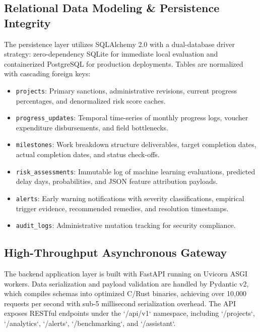\documentclass[conference]{IEEEtran}
\begin{document}
\subsection{Relational Data Modeling \& Persistence Integrity}
The persistence layer utilizes SQLAlchemy 2.0 with a dual-database driver strategy: zero-dependency SQLite for immediate local evaluation and containerized PostgreSQL for production deployments. Tables are normalized with cascading foreign keys:
\begin{itemize}
    \item \texttt{projects}: Primary sanctions, administrative revisions, current progress percentages, and denormalized risk score caches.
    \item \texttt{progress\_updates}: Temporal time-series of monthly progress logs, voucher expenditure disbursements, and field bottlenecks.
    \item \texttt{milestones}: Work breakdown structure deliverables, target completion dates, actual completion dates, and status check-offs.
    \item \texttt{risk\_assessments}: Immutable log of machine learning evaluations, predicted delay days, probabilities, and JSON feature attribution payloads.
    \item \texttt{alerts}: Early warning notifications with severity classifications, empirical trigger evidence, recommended remedies, and resolution timestamps.
    \item \texttt{audit\_logs}: Administrative mutation tracking for security compliance.
\end{itemize}

\subsection{High-Throughput Asynchronous Gateway}
The backend application layer is built with FastAPI running on Uvicorn ASGI workers. Data serialization and payload validation are handled by Pydantic v2, which compiles schemas into optimized C/Rust binaries, achieving over 10,000 requests per second with sub-5 millisecond serialization overhead. The API exposes RESTful endpoints under the `/api/v1` namespace, including `/projects`, `/analytics`, `/alerts`, `/benchmarking`, and `/assistant`.
\end{document}
